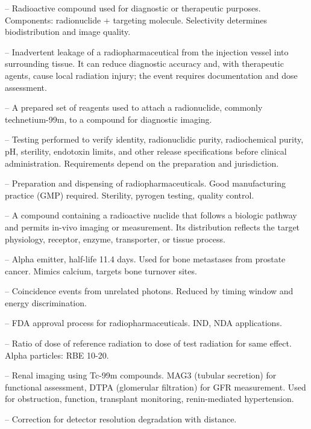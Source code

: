 -- Radioactive compound used for diagnostic or therapeutic purposes. Components: radionuclide + targeting molecule. Selectivity determines biodistribution and image quality.

-- Inadvertent leakage of a radiopharmaceutical from the injection vessel into surrounding tissue. It can reduce diagnostic accuracy and, with therapeutic agents, cause local radiation injury; the event requires documentation and dose assessment.

-- A prepared set of reagents used to attach a radionuclide, commonly technetium-99m, to a compound for diagnostic imaging.


-- Testing performed to verify identity, radionuclidic purity, radiochemical purity, pH, sterility, endotoxin limits, and other release specifications before clinical administration. Requirements depend on the preparation and jurisdiction.

-- Preparation and dispensing of radiopharmaceuticals. Good manufacturing practice (GMP) required. Sterility, pyrogen testing, quality control.

-- A compound containing a radioactive nuclide that follows a biologic pathway and permits in-vivo imaging or measurement. Its distribution reflects the target physiology, receptor, enzyme, transporter, or tissue process.


-- Alpha emitter, half-life 11.4 days. Used for bone metastases from prostate cancer. Mimics calcium, targets bone turnover sites.

-- Coincidence events from unrelated photons. Reduced by timing window and energy discrimination.

-- FDA approval process for radiopharmaceuticals. IND, NDA applications.

-- Ratio of dose of reference radiation to dose of test radiation for same effect. Alpha particles: RBE 10-20.

-- Renal imaging using Tc-99m compounds. MAG3 (tubular secretion) for functional assessment, DTPA (glomerular filtration) for GFR measurement. Used for obstruction, function, transplant monitoring, renin-mediated hypertension.

-- Correction for detector resolution degradation with distance.

